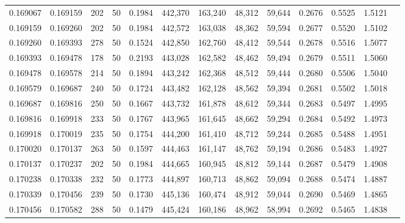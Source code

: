 \begin{tabular}{rrrrrrrrrrrrr}
0.169067 & 0.169159 &   202 &  50 &                                     0.1984 & 442,370 & 163,240 &  48,312 &  59,644 & 0.2676 & 0.5525 & 1.5121 \\
0.169159 & 0.169260 &   202 &  50 &                                     0.1984 & 442,572 & 163,038 &  48,362 &  59,594 & 0.2677 & 0.5520 & 1.5102 \\
0.169260 & 0.169393 &   278 &  50 &                                     0.1524 & 442,850 & 162,760 &  48,412 &  59,544 & 0.2678 & 0.5516 & 1.5077 \\
0.169393 & 0.169478 &   178 &  50 &                                     0.2193 & 443,028 & 162,582 &  48,462 &  59,494 & 0.2679 & 0.5511 & 1.5060 \\
0.169478 & 0.169578 &   214 &  50 &                                     0.1894 & 443,242 & 162,368 &  48,512 &  59,444 & 0.2680 & 0.5506 & 1.5040 \\
0.169579 & 0.169687 &   240 &  50 &                                     0.1724 & 443,482 & 162,128 &  48,562 &  59,394 & 0.2681 & 0.5502 & 1.5018 \\
0.169687 & 0.169816 &   250 &  50 &                                     0.1667 & 443,732 & 161,878 &  48,612 &  59,344 & 0.2683 & 0.5497 & 1.4995 \\
0.169816 & 0.169918 &   233 &  50 &                                     0.1767 & 443,965 & 161,645 &  48,662 &  59,294 & 0.2684 & 0.5492 & 1.4973 \\
0.169918 & 0.170019 &   235 &  50 &                                     0.1754 & 444,200 & 161,410 &  48,712 &  59,244 & 0.2685 & 0.5488 & 1.4951 \\
0.170020 & 0.170137 &   263 &  50 &                                     0.1597 & 444,463 & 161,147 &  48,762 &  59,194 & 0.2686 & 0.5483 & 1.4927 \\
0.170137 & 0.170237 &   202 &  50 &                                     0.1984 & 444,665 & 160,945 &  48,812 &  59,144 & 0.2687 & 0.5479 & 1.4908 \\
0.170238 & 0.170338 &   232 &  50 &                                     0.1773 & 444,897 & 160,713 &  48,862 &  59,094 & 0.2688 & 0.5474 & 1.4887 \\
0.170339 & 0.170456 &   239 &  50 &                                     0.1730 & 445,136 & 160,474 &  48,912 &  59,044 & 0.2690 & 0.5469 & 1.4865 \\
0.170456 & 0.170582 &   288 &  50 &                                     0.1479 & 445,424 & 160,186 &  48,962 &  58,994 & 0.2692 & 0.5465 & 1.4838 \\

\end{tabular}

